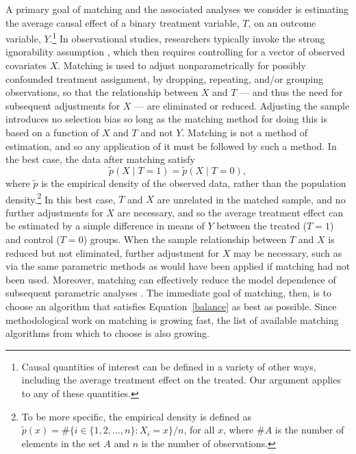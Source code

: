 \documentclass[11pt,titlepage]{article}
\begin{document}
A primary goal of matching and the associated analyses we consider is
estimating the average causal effect of a binary treatment variable,
$T$, on an outcome variable, $Y$.\footnote{Causal quantities of
  interest can be defined in a variety of other ways, including the
  average treatment effect on the treated.  Our argument applies to
  any of these quantities.}  In observational studies, researchers
typically invoke the strong ignorability assumption \citep{RosRub83},
which then requires controlling for a vector of observed covariates
$X$.  Matching is used to adjust nonparametrically for possibly
confounded treatment assignment, by dropping, repeating, and/or
grouping observations, so that the relationship between $X$ and $T$
--- and thus the need for subsequent adjustments for $X$ --- are
eliminated or reduced.  Adjusting the sample introduces no selection
bias so long as the matching method for doing this is based on a
function of $X$ and $T$ and not $Y$.  Matching is not a method of
estimation, and so any application of it must be followed by such a
method.  In the best case, the data after matching satisfy
\begin{equation}
  \label{balance}
  \tilde p(X\mid T=1) = \tilde p(X\mid T=0),
\end{equation}
where $\tilde p$ is the empirical density of the observed data, rather
than the population density.\footnote{To be more specific, the
  empirical density is defined as $\tilde p(x) = \# \{ i\in \{1, 2,
  \dots, n \}: X_i = x \} / n$, for all $x$, where $\#A$ is the number
  of elements in the set $A$ and $n$ is the number of observations. }
In this best case, $T$ and $X$ are unrelated in the matched sample,
and no further adjustments for $X$ are necessary, and so the average
treatment effect can be estimated by a simple difference in means of
$Y$ between the treated ($T=1$) and control ($T=0$) groups.  When the
sample relationship between $T$ and $X$ is reduced but not eliminated,
further adjustment for $X$ may be necessary, such as via the same
parametric methods as would have been applied if matching had not been
used. Moreover, matching can effectively reduce the model dependence
of subsequent parametric analyses \citep{HoImaKin06}.  The immediate
goal of matching, then, is to choose an algorithm that satisfies
Equation~\ref{balance} as best as possible.  Since methodological work
on matching is growing fast, the list of available matching algorithms
from which to choose is also growing.
\end{document}
